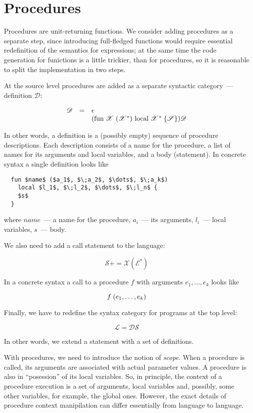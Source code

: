 \section{Procedures}

Procedures are unit-returning functions. We consider adding procedures as a separate step, since introducing full-fledged functions would require
essential redefinition of the semantics for expressions; at the same time the code generation for funictions is a little trickier, than for procedures, so
it is reasonable to split the implementation in two steps.

At the source level procedures are added as a separate syntactic category~--- definition $\mathscr D$:

\[
\begin{array}{rcl}
  \mathscr D & = & \epsilon \\
             &   & (\llang{fun $\;\mathscr X\;$ ($\mathscr X^*$) local $\;\mathscr X^*\;$ \{$\mathscr S$\}})\mathscr D
\end{array}
\]

In other words, a definition is a (possibly empty) sequence of procedure descriptions. Each description consists of a name for the procedure, a
list of names for its arguments and local variables, and a body (statement). In concrete syntax a single definition looks like

\begin{lstlisting}
  fun $name$ ($a_1$, $\;a_2$, $\dots$, $\;a_k$)
    local $l_1$, $\;l_2$, $\dots$, $\;l_n$ {
    $s$
  }  
\end{lstlisting}

where $name$~--- a name for the procedure, $a_i$~--- its arguments, $l_i$~--- local variables, $s$~--- body.

We also need to add a call statement to the language:

\[
\mathscr S += \mathscr X (\mathscr E^*)
\]

In a concrete syntax a call to a procedure $f$ with arguments $e_1,\dots,e_k$ looks like

\[
  \llang{$f\;$ ($e_1,\dots,e_k$)}
\]

Finally, we have to redefine the syntax category for programs at the top level:

\[
\mathscr L = \mathscr D\mathscr S
\]

In other words, we extend a statement with a set of definitions.

With procedures, we need to introduce the notion of \emph{scope}. When a procedure is called, its arguments
are associated with actual parameter values. A procedure is also in ``posession'' of its local variables.
So, in principle, the context of a procedure execution is a set of arguments, local variables and, possibly, some
other variables, for example, the global ones. However, the exact details of procedure context manipilation can
differ essentially from language to language.

